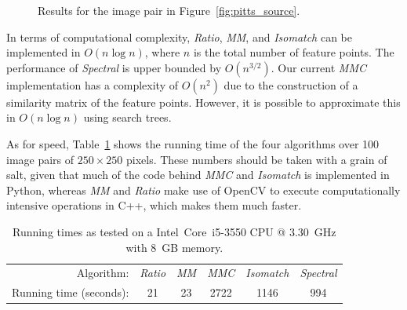 \begin{figure}[htb]
\begin{subfigure}[c]{.8\textwidth}
	\end{subfigure}%
	\caption{Results for the image pair in 
	Figure~\ref{fig:pitts_source}.}
	\label{fig:result_pitts}
\end{figure}

In terms of computational complexity, \emph{Ratio}, \emph{MM}, and 
\emph{Isomatch} can be implemented in $O(n\log n)$, where $n$ is the 
total number of feature points. The performance of \emph{Spectral} is 
upper bounded by $O(n^{3/2})$. Our current \emph{MMC} implementation has 
a complexity of $O(n^2)$ due to the construction of a similarity matrix 
of the feature points.  However, it is possible to approximate this in 
$O(n\log n)$ using search trees.  

As for speed, Table~\ref{table:running_times} shows the running time of 
the four algorithms over 100 image pairs of $250\!\times\!250$ pixels.  
These numbers should be taken with a grain of salt, given that much of 
the code behind \emph{MMC} and \emph{Isomatch} is implemented in Python, 
whereas \emph{MM} and \emph{Ratio} make use of OpenCV to execute 
computationally intensive operations in C++, which makes them much 
faster. 

\begin{table}[htb]
\caption{Running times as tested on a Intel\textregistered\ Core\texttrademark\ i5-3550 CPU @ 
3.30~GHz with 8~GB memory.}
\label{table:running_times}
	\centering
\begin{tabular}{r*{5}{c}}
\hline
	Algorithm: & \emph{Ratio} & \emph{MM} & \emph{MMC} %
& \emph{Isomatch} & \emph{Spectral}	\\
	\noalign{\smallskip} 
	Running time (seconds): & 21 & 23 & 2722 & 1146 & 994\\
	\hline
\end{tabular}
\end{table}
